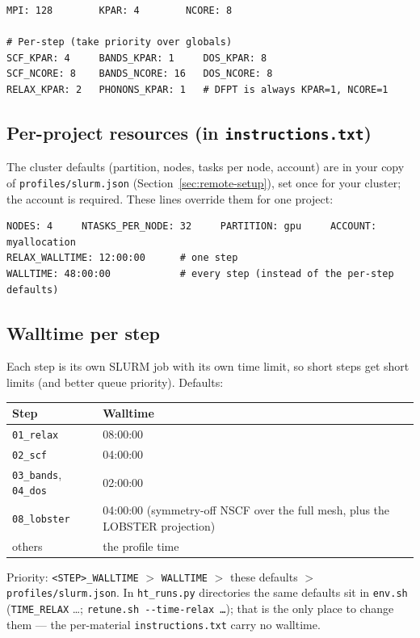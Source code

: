 \documentclass[11pt,a4paper]{scrartcl}
\newcommand{\thead}{\rowcolor{lightblue}}
\begin{document}
\begin{lstlisting}
MPI: 128        KPAR: 4        NCORE: 8

# Per-step (take priority over globals)
SCF_KPAR: 4     BANDS_KPAR: 1     DOS_KPAR: 8
SCF_NCORE: 8    BANDS_NCORE: 16   DOS_NCORE: 8
RELAX_KPAR: 2   PHONONS_KPAR: 1   # DFPT is always KPAR=1, NCORE=1
\end{lstlisting}

\subsection{Per-project resources (in \texttt{instructions.txt})}

The cluster defaults (partition, nodes, tasks per node, account) are in your copy of
\texttt{profiles/slurm.json} (Section~\ref{sec:remote-setup}), set once for your cluster; the account is
required. These lines override them for one project:

\begin{lstlisting}
NODES: 4     NTASKS_PER_NODE: 32     PARTITION: gpu     ACCOUNT: myallocation
RELAX_WALLTIME: 12:00:00      # one step
WALLTIME: 48:00:00            # every step (instead of the per-step defaults)
\end{lstlisting}

\subsection{Walltime per step}
\label{sec:slurm-time}

Each step is its own SLURM job with its own time limit, so short steps get
short limits (and better queue priority).  Defaults:

\begin{tabularx}{\linewidth}{@{}lX@{}}
\thead
Step & Walltime \\ \midrule
\texttt{01\_relax} & 08:00:00 \\
\texttt{02\_scf} & 04:00:00 \\
\texttt{03\_bands}, \texttt{04\_dos} & 02:00:00 \\
\texttt{08\_lobster} & 04:00:00 (symmetry-off NSCF over the full mesh, plus the
  LOBSTER projection) \\
others & the profile time \\
\bottomrule
\end{tabularx}

Priority: \texttt{<STEP>\_WALLTIME} $>$ \texttt{WALLTIME} $>$ these defaults
$>$ \texttt{profiles/slurm.json}.  In \texttt{ht\_runs.py} directories
the same defaults sit in \texttt{env.sh} (\texttt{TIME\_RELAX} \ldots;
\texttt{retune.sh -{}-time-relax \ldots}); that is the only place to change
them --- the per-material \texttt{instructions.txt} carry no walltime.
\end{document}
